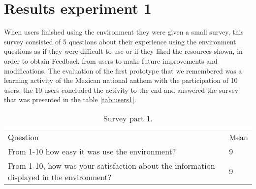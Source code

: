 \section{Results experiment 1}
When users finished using the environment they were given a small survey, this survey consisted of 5 questions about their experience using the environment questions as if they were difficult to use or if they liked the resources shown, in order to obtain Feedback from users to make future improvements and modifications. The evaluation of the first prototype that we remembered was a learning activity of the Mexican national anthem with the participation of 10 users, the 10 users concluded the activity to the end and answered the survey that was presented in the table \ref{tab:users1}.
\begin{table}
\centering
\small
\captionsetup{font=footnotesize}
\caption{Survey part 1.}
\label{tab:survey1} 

\small
\begin{tabular}{p{7cm} p{3cm} }
\hline{\smallskip}
Question	& Mean\\
\noalign{\smallskip}\hline\noalign{\smallskip}
\small{	From 1-10 how easy it was use the environment? 	}& \small{	9	}\\
\small{	From 1-10, how was your satisfaction about the information displayed in the environment?  	}& \small{	9	}\\
\hline
\end{tabular}
\end{table}

